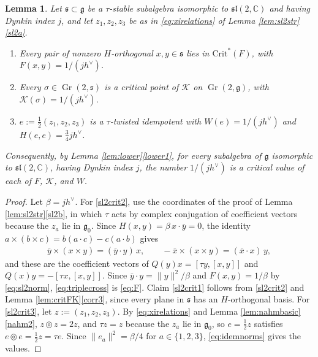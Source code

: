 \documentclass [leqno, 10pt]{amsart}
\newtheorem{lemma}[theorem]{Lemma}%
\theoremstyle{definition}
\numberwithin{equation}{section}
\newcommand{\grass}{\operatorname{Gr}}
\newcommand{\sect}{\mathscr{K}}
\newcommand{\tmlt}{\circledcirc}
\newcommand{\sll}{\mathfrak{sl}}
\newcommand{\g}{\mathfrak{g}}
\newcommand{\com}{\mathbb C}
\newcommand{\gz}{\g_{0}}
\newcommand{\crtnt}{\mathrm{Crit}^*}
\newcommand{\hv}{h^\vee}
\newcommand{\norm}[1]{\lVert #1\rVert}
\newcommand{\subs}{\mathfrak{s}}
\newcommand{\qad}{Q}
\begin{document}
\begin{lemma}\label{thm:sl2crit}
Let $\subs \subset \g$ be a $\tau$-stable subalgebra isomorphic to $\sll(2, \com)$ and having Dynkin index $j$, and let $z_{1}, z_{2}, z_{3}$ be as in \eqref{eq:xirelations} of Lemma \ref{lem:sl2str}\ref{sl2a}.
\begin{enumerate}[label=(\arabic*), ref=(\arabic*)]
\item\label{sl2crit2} Every pair of nonzero $H$-orthogonal $x, y \in \subs$ lies in $\crtnt(F)$, with $F(x, y) = 1/(j\hv)$.
\item\label{sl2crit1} Every $\sigma \in \grass(2, \subs)$ is a critical point of $\sect$ on $\grass(2, \g)$, with $\sect(\sigma) = 1/(j\hv)$.
\item\label{sl2crit3} $e := \tfrac{1}{2}(z_{1}, z_{2}, z_{3})$ is a $\tau$-twisted idempotent with $W(e) = 1/(j\hv)$ and $H(e, e) = \tfrac{3}{4}j\hv$.
\end{enumerate}
Consequently, by Lemma \ref{lem:lower}\ref{lower1}, for every subalgebra of $\g$ isomorphic to $\sll(2, \com)$, having Dynkin index $j$, the number $1/(j\hv)$ is a critical value of each of $F$, $\sect$, and $W$.
\end{lemma}
\begin{proof}
Let $\beta = j\hv$. For \ref{sl2crit2}, use the coordinates of the proof of Lemma \ref{lem:sl2str}\ref{sl2b}, in which $\tau$ acts by complex conjugation of coefficient vectors because the $z_{a}$ lie in $\gz$. Since $H(x, y) = \beta\,x\cdot\bar{y} = 0$, the identity $a \times (b \times c) = b(a \cdot c) - c(a \cdot b)$ gives
\begin{align}\label{eq:triplecross}
\bar{y}\times(x \times y) = (\bar{y}\cdot y)\,x, \qquad -\bar{x}\times(x \times y) = (\bar{x}\cdot x)\,y,
\end{align}
and these are the coefficient vectors of $\qad(y)x = [\tau y, [x, y]]$ and $\qad(x)y = -[\tau x, [x, y]]$. Since $\bar{y}\cdot y = \norm{y}^{2}/\beta$ and $F(x, y) = 1/\beta$ by \eqref{eq:sl2norm}, \eqref{eq:triplecross} is \eqref{eq:F}. Claim \ref{sl2crit1} follows from \ref{sl2crit2} and Lemma \ref{lem:critFK}\ref{corr3}, since every plane in $\subs$ has an $H$-orthogonal basis. For \ref{sl2crit3}, let $z := (z_{1}, z_{2}, z_{3})$. By \eqref{eq:xirelations} and Lemma \ref{lem:nahmbasic}\ref{nahm2}, $z \tmlt z = 2z$, and $\tau z = z$ because the $z_{a}$ lie in $\gz$, so $e = \tfrac{1}{2}z$ satisfies $e \tmlt e = \tfrac{1}{2}z = \tau e$. Since $\norm{e_{a}}^{2} = \beta/4$ for $a \in \{1, 2, 3\}$, \eqref{eq:idemnorms} gives the values.
\end{proof}
\end{document}
